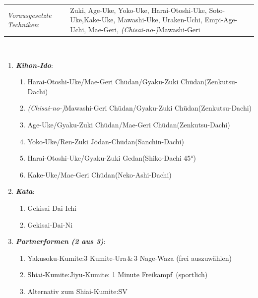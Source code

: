 	\renewcommand{\labelenumi}{\alph{enumi}.)}
	\renewcommand{\labelenumii}{\arabic*.}
{\scriptsize 	\begin{tabularx}{\textwidth}{lX}
		\textit{Vorausgesetzte Techniken}:& Zuki, Age-Uke, Yoko-Uke, Harai-Otoshi-Uke, Soto-Uke,Kake-Uke, Mawashi-Uke, Uraken-Uchi, Empi-Age-Uchi, Mae-Geri, \textit{(Chisai-no-)}Mawashi-Geri
	\end{tabularx}\\}
	\begin{enumerate}[nosep]
		\item \textit{\textbf{Kihon-Ido}}:
		\begin{enumerate}[nosep]
			\item Harai-Otoshi-Uke/Mae-Geri Ch\={u}dan/Gyaku-Zuki Ch\={u}dan\tabto{280pt}(Zenkutsu-Dachi)
			\item \textit{(Chisai-no-)}Mawashi-Geri Ch\={u}dan/Gyaku-Zuki Ch\={u}dan\tabto{280pt}(Zenkutsu-Dachi)
			\item Age-Uke/Gyaku-Zuki Ch\={u}dan/Mae-Geri Ch\={u}dan\tabto{280pt}(Zenkutsu-Dachi)
			\item Yoko-Uke/Ren-Zuki J\={o}dan-Ch\={u}dan\tabto{280pt}(Sanchin-Dachi)
			\item Harai-Otoshi-Uke/Gyaku-Zuki Gedan\tabto{280pt}(Shiko-Dachi 45°)
			\item Kake-Uke/Mae-Geri Ch\={u}dan\tabto{280pt}(Neko-Ashi-Dachi)
		\end{enumerate}
		\item \textit{\textbf{Kata}}:
			\begin{enumerate}[nosep]
			\item Gekisai-Dai-Ichi
			\item Gekisai-Dai-Ni
			\end{enumerate}
		\item \textit{\textbf{Partnerformen (2 aus 3)}}:
		\begin{enumerate}[nosep]
			\item Yakusoku-Kumite:\tabto{200pt}3 Kumite-Ura\,\&\,3 Nage-Waza (frei auszuwählen)
			\item Shiai-Kumite:\tabto{200pt}Jiyu-Kumite: 1 Minute \frqq Freikampf\flqq~(sportlich)
			\item Alternativ zum Shiai-Kumite:\tabto{200pt}SV
		\end{enumerate}
	\end{enumerate}
